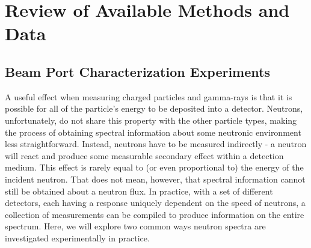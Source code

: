 \cleardoublepage

\chapter{Review of Available Methods and Data}


\section{Beam Port Characterization Experiments}

A useful effect when measuring charged particles and gamma-rays is that it is possible for all of the particle's energy to be deposited into a detector.
Neutrons, unfortunately, do not share this property with the other particle types, making the process of obtaining spectral information about some neutronic environment less straightforward.
Instead, neutrons have to be measured indirectly - a neutron will react and produce some measurable secondary effect within a detection medium.
This effect is rarely equal to (or even proportional to) the energy of the incident neutron.
That does not mean, however, that spectral information cannot still be obtained about a neutron flux.
In practice, with a set of different detectors, each having a response uniquely dependent on the speed of neutrons, a collection of measurements can be compiled to produce information on the entire spectrum.
Here, we will explore two common ways neutron spectra are investigated experimentally in practice.

